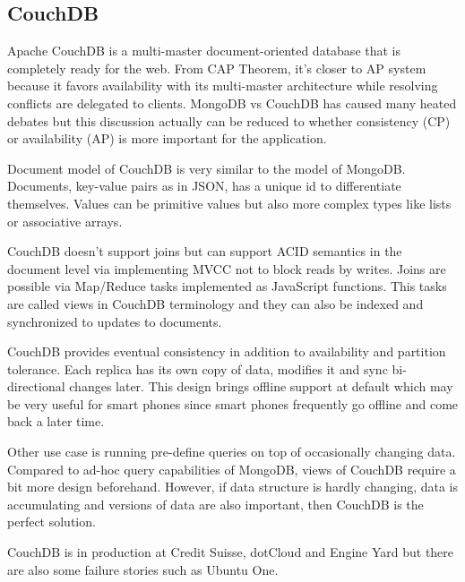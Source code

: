 \subsection{CouchDB}

Apache CouchDB is a multi-master document-oriented database that is completely ready for the web.
From CAP Theorem, it's closer to AP system because it favors availability with its multi-master architecture while resolving conflicts are delegated to clients.
MongoDB vs CouchDB has caused many heated debates but this discussion actually can be reduced to whether consistency (CP) or availability (AP) is more important for the application.

Document model of CouchDB is very similar to the model of MongoDB. Documents, key-value pairs as in JSON, has a unique id to differentiate themselves.
Values can be primitive values but also more complex types like lists or associative arrays.

CouchDB doesn't support joins but can support ACID semantics in the document level via implementing MVCC not to block reads by writes.
Joins are possible via Map/Reduce tasks implemented as JavaScript functions.
This tasks are called views in CouchDB terminology and they can also be indexed and synchronized to updates to documents.

CouchDB provides eventual consistency in addition to availability and partition tolerance.
Each replica has its own copy of data, modifies it and sync bi-directional changes later.
This design brings offline support at default which may be very useful for smart phones since smart phones frequently go offline and come back a later time.

Other use case is running pre-define queries on top of occasionally changing data.
Compared to ad-hoc query capabilities of MongoDB, views of CouchDB require a bit more design beforehand.
However, if data structure is hardly changing, data is accumulating and versions of data are also important, then CouchDB is the perfect solution.

CouchDB is in production at Credit Suisse, dotCloud and Engine Yard but there are also some failure stories such as Ubuntu One.

